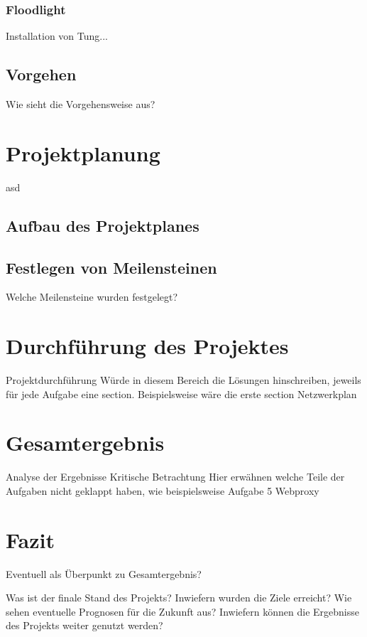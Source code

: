 \documentclass[fontsize=12pt,paper=a4,open=any,parskip=half,
  twoside=false,toc=listof,toc=bibliography,fleqn,leqno,
  captions=nooneline,captions=tableabove,british]{scrbook}
\begin{document}
\subsection{Floodlight}
Installation von Tung...
\section{Vorgehen}
Wie sieht die Vorgehensweise aus?


\chapter{Projektplanung}
asd
\section{Aufbau des Projektplanes}
\section{Festlegen von Meilensteinen}
Welche Meilensteine wurden festgelegt?


\chapter{Durchführung des Projektes}
Projektdurchführung
 Würde in diesem Bereich die Lösungen hinschreiben, jeweils für jede Aufgabe eine section. Beispielsweise wäre die erste section Netzwerkplan
\chapter{Gesamtergebnis}
Analyse der Ergebnisse
Kritische Betrachtung
Hier erwähnen welche Teile der Aufgaben nicht geklappt haben, wie beispielsweise Aufgabe 5 Webproxy

\chapter{Fazit}\label{ch:fazit}
Eventuell als Überpunkt zu Gesamtergebnis?

Was ist der finale Stand des Projekts?
Inwiefern wurden die Ziele erreicht?
Wie sehen eventuelle Prognosen für die Zukunft aus?
Inwiefern können die Ergebnisse des Projekts weiter genutzt werden?
\par
\end{document}
